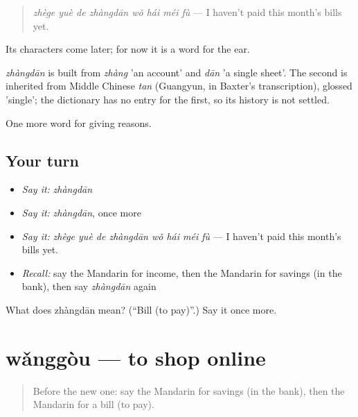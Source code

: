\begin{quote}
\emph{zhège yuè de zhàngdān wǒ hái méi fù} — I haven't paid this month's bills yet.
\end{quote}

Its characters come later; for now it is a word for the ear.

\begin{cousinweb}
\emph{zhàngdān} is built from \emph{zhàng} 'an account' and \emph{dān} 'a single sheet'. The second is inherited from Middle Chinese \emph{tan} (Guangyun, in Baxter's transcription), glossed 'single'; the dictionary has no entry for the first, so its history is not settled.
\end{cousinweb}

\begin{grammarlens}[title={What you've built}]
One more word for giving reasons.
\end{grammarlens}

\subsection*{Your turn}
\begin{itemize}
\raggedright
  \item \emph{Say it:} \emph{zhàngdān}
  \item \emph{Say it:} \emph{zhàngdān}, once more
  \item \emph{Say it:} \emph{zhège yuè de zhàngdān wǒ hái méi fù} — I haven't paid this month's bills yet.
  \item \emph{Recall:} say the Mandarin for income, then the Mandarin for savings (in the bank), then say \emph{zhàngdān} again
\end{itemize}

\begin{tcolorbox}[breakable,colback=teal!4,colframe=teal!35!black,title={Before you move on}]
What does zhàngdān mean? (\textquotedblleft{}Bill (to pay)\textquotedblright{}.) Say it once more.
\end{tcolorbox}
\section[wǎnggòu]{wǎnggòu — to shop online}

\label{lesson:ZH-C387-wanggou}



\begin{quote}
Before the new one: say the Mandarin for savings (in the bank), then the Mandarin for a bill (to pay).
\end{quote}


